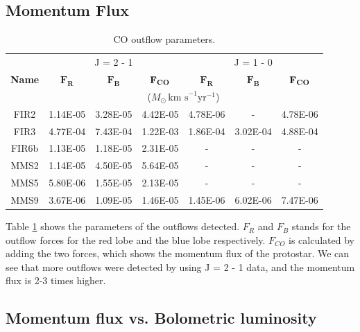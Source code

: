 \subsection{Momentum Flux}


\begin{table}[h]
	\caption{CO outflow parameters.} \label{table:result}
	\begin{center}
		\begin{tabular}{c|c|c|c||c|c|c}
			\toprule
			\multirow{3}{1cm}{\textbf{Name}} & \multicolumn{3}{c}{J = 2 - 1} & \multicolumn{3}{c}{J = 1 - 0} \\
			& $\mathbf{F_{R}}$ & $\mathbf{F_{B}}$ & $\mathbf{F_{\textrm{\textbf{CO}}}}$ & $\mathbf{F_{R}}$ & $\mathbf{F_{B}}$ & $\mathbf{F_{\textrm{\textbf{CO}}}}$\\
			& \multicolumn{6}{c}{($M_{\odot} \, \textrm{km s}^{-1} \textrm{yr}^{-1}$)}\\
			\midrule
			FIR2 & 1.14E-05 & 3.28E-05 & 4.42E-05 & 4.78E-06 & - & 4.78E-06\\
			FIR3 & 4.77E-04 & 7.43E-04 & 1.22E-03 & 1.86E-04 & 3.02E-04 & 4.88E-04\\
			FIR6b & 1.13E-05 & 1.18E-05 & 2.31E-05 & - & - & -\\
			MMS2 & 1.14E-05 & 4.50E-05 & 5.64E-05 & - & - & -\\
			MMS5 & 5.80E-06 & 1.55E-05 & 2.13E-05 & - & - & -\\
			MMS9 & 3.67E-06 & 1.09E-05 & 1.46E-05 & 1.45E-06 & 6.02E-06 & 7.47E-06\\
			\toprule
		\end{tabular}
	\end{center}
\end{table}


\noindent Table \ref{table:result} shows the parameters of the outflows detected. $F_R$ and $F_B$ stands for the outflow forces for the red lobe and the blue lobe respectively. $F_{CO}$ is calculated by adding the two forces, which shows the momentum flux of the protostar. We can see that more outflows were detected by using J = 2 - 1 data, and the momentum flux is 2-3 times higher.\\

\clearpage
\newpage
\subsection{Momentum flux vs. Bolometric luminosity}

